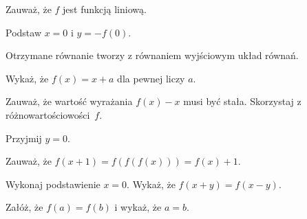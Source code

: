 
\begin{hints_list}
	\item *
	\item Zauważ, że $f$ jest funkcją liniową.
	\item Podstaw $x = 0$ i $y = - f(0)$.
	\item Otrzymane równanie tworzy z równaniem wyjściowym układ równań.
	\item Wykaż, że $f(x) = x + a$ dla pewnej liczy $a$.
	\item Zauważ, że wartość wyrażania $f(x) - x$ musi być stała. Skorzystaj z różnowartościowości~$f$.
	\item Przyjmij $y = 0$.
	\item Zauważ, że $f(x + 1) = f(f(f(x))) = f(x) + 1$.
	\item Wykonaj podstawienie $x = 0$. Wykaż, że $f(x + y) = f(x - y)$.
	\item Załóż, że $f(a) = f(b)$ i wykaż, że $a = b$.
\end{hints_list}